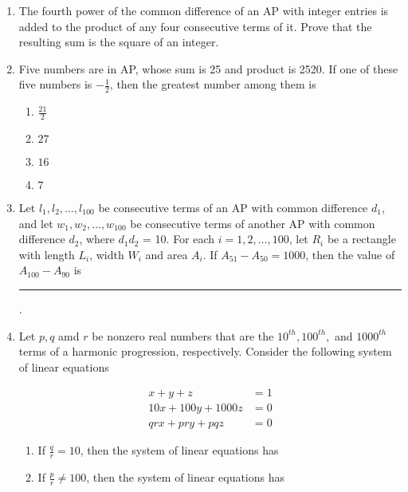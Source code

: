 \begin{enumerate}    [label=\thesubsection.\arabic*, ref=\thesubsection.\theenumi]
%       
			\hfill {}
%      
%
%
      \item The fourth power of the common difference of an  AP  with integer entries is added to the product of any four consecutive terms of it. Prove that the resulting sum is the square of an integer.
%      
	      \hfill {}
%    
\item     Five numbers are in AP, whose sum is 25 and product is 2520. If one of these five numbers is $-\frac{1}{2}$, then the greatest number among them is
\hfill {}
%
\begin{multicols}{4}
\begin{enumerate}    
\item     $\frac{21}{2}$
\item     $27$
\item     $16$
\item     $7$
\end{enumerate}
\end{multicols}
%
%     
%
\item     Let $l_1,l_2,\dots,l_{100}$ be consecutive terms of an  AP  with common difference $d_1$, and let $w_1, w_2, \dots , w_{100}$ be consecutive terms of another  AP  with common difference $d_2 $, where $d_1d_2$ = 10. For each $i = 1, 2,\dots,100$, let $R_i$ be a rectangle with length $L_i$, width $W_i$ and area $A_i$. If $A_{51}-A_{50}=1000$, then the value of $A_{100}-A_{90}$ is \rule{1cm}{0.1pt}.
	\hfill {}
\item     Let $p,q$ amd $r$  be nonzero real numbers that are the $10^{th}, 100^{th},$ and $1000^{th}$ terms of a harmonic progression, respectively. Consider the following system of linear equations

	\hfill {}
\begin{align*}
x + y + z &= 1
\\
10x + 100y + 1000z &= 0
\\
qr x + pr y + pq z &= 0
\end{align*}

		\begin{multicols}{2}
			\begin{enumerate}[label=(\Roman*)]		
\item     If $ \frac{q}{r} = 10 $, then the system of linear equations has 

\item      If $ \frac{p}{r} \neq 100 $, then the system of linear equations has 


\end{enumerate}
\end{multicols}
\end{enumerate}
